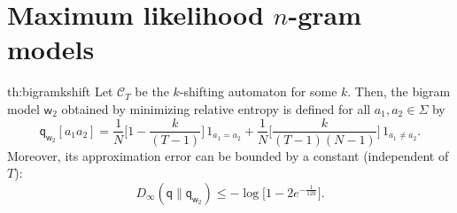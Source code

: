 \documentclass{article}
\newcommand{\sC}{\mathscr C}
\newcommand{\sfq}{{\mathsf q}}
\newcommand{\sfw}{{\mathsf w}}
\begin{document}
\newpage
\section{Maximum likelihood $n$-gram models}
\label{app:mlapprox}


\begin{reptheorem}{th:bigramkshift}
Let $\sC_T$ be the $k$-shifting automaton for some $k$.  Then, the
bigram model $\sfw_2$ obtained by minimizing relative entropy is
defined for all $a_1, a_2 \in \Sigma$ by
\begin{equation*}
  \sfq_{\sfw_2}[a_1a_2]  = \frac{1}{N}\Big[ 1 - \frac{k}{(T - 1)}\Big] \, 1_{a_1
    = a_2} + \frac{1}{N} \Big[ \frac{k}{(T - 1)(N - 1)} \Big] \, 1_{a_1 \neq a_2}.
\end{equation*}
Moreover, its approximation error can be bounded by a constant
(independent of $T$):
\begin{equation*}
    D_\infty(\sfq \| \sfq_{\sfw_2}) \leq  - \log \big[ 1 - 2e^{-\frac{1}{12k}} \big].
\end{equation*}
\end{reptheorem}
\end{document}

